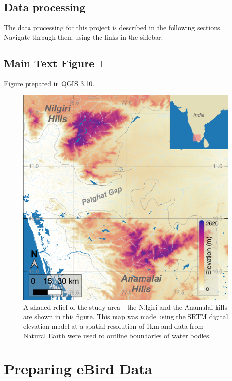 \documentclass[]{article}
\begin{document}
\hypertarget{data-processing}{%
\subsection{Data processing}\label{data-processing}}

The data processing for this project is described in the following sections. Navigate through them using the links in the sidebar.

\hypertarget{main-text-figure-1}{%
\subsection{Main Text Figure 1}\label{main-text-figure-1}}

Figure prepared in QGIS 3.10.

\begin{figure}
\centering
\includegraphics{figs/fig_01_elevation.png}
\caption{A shaded relief of the study area - the Nilgiri and the Anamalai hills are shown in this figure. This map was made using the SRTM digital elevation model at a spatial resolution of 1km and data from Natural Earth were used to outline boundaries of water bodies.}
\end{figure}

\hypertarget{preparing-ebird-data}{%
\section{Preparing eBird Data}\label{preparing-ebird-data}}
\end{document}
